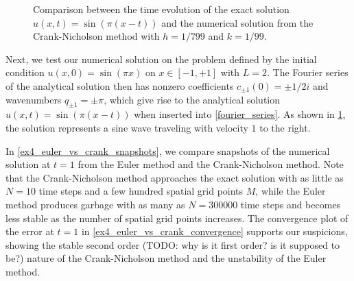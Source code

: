 \begin{figure}[b]
\centering
{}
\caption{\label{sine_evolution}Comparison between the time evolution of the exact solution $u(x,t)=\sin(\pi(x-t))$ and the numerical solution from the Crank-Nicholson method with $h=1/799$ and $k=1/99$.}
\end{figure}

Next, we test our numerical solution on the problem defined by the initial condition $u(x, 0) = \sin(\pi x)$ on $x \in [-1, +1]$ with $L = 2$.
The Fourier series of the analytical solution then has nonzero coefficients $c_{\pm1}(0) = \pm 1/2i$ and wavenumbers $q_{\pm 1} = \pm \pi$, which give rise to the analytical solution $u(x, t) = \sin(\pi(x-t))$ when inserted into \cref{fourier_series}.
As shown in \cref{sine_evolution}, the solution represents a sine wave traveling with velocity $1$ to the right.

In \cref{ex4_euler_vs_crank_snapshots}, we compare snapshots of the numerical solution at $t = 1$ from the Euler method and the Crank-Nicholson method.
Note that the Crank-Nicholson method approaches the exact solution with as little as $N=10$ time steps and a few hundred spatial grid points $M$, while the Euler method produces garbage with as many as $N=300 000$ time steps and becomes less stable as the number of spatial grid points increases.
The convergence plot of the error at $t=1$ in \cref{ex4_euler_vs_crank_convergence} supports our suspicions, showing the stable second order (TODO: why is it first order? is it supposed to be?) nature of the Crank-Nicholson method and the unstability of the Euler method.

